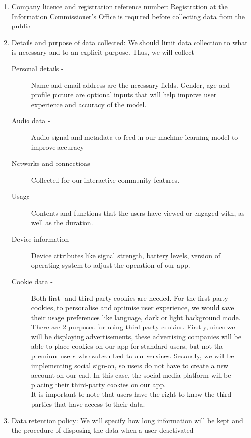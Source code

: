 \begin{enumerate}
    \item Company licence and registration reference number: Registration at the Information Commissioner's Office is required
    before collecting data from the public
    \item Details and purpose of data collected: We should limit data collection to what is necessary and to an explicit purpose.
    Thus, we will collect
    \begin{description}
        \item[Personal details -] Name and email address are the necessary fields. Gender, age and profile picture are optional inputs 
        that will help improve user experience and accuracy of the model. 
        \item[Audio data -] Audio signal and metadata to feed in our machine learning model to improve accuracy.
        \item[Networks and connections -] Collected for our interactive community features.
        \item[Usage -] Contents and functions that the users have viewed or engaged with, as well as the duration.
        \item[Device information -] Device attributes like signal strength, battery levels, version of operating system to adjust the operation of our app.
        \item[Cookie data -] Both first- and third-party cookies are needed. For the first-party cookies, to personalise and optimise user
        experience, we would save their usage preferences like language, dark or light background mode. 
        \\There are 2 purposes for using third-party cookies. Firstly, since we will be displaying advertisements, 
        these advertising companies will be able to place cookies on our app for standard users, but not the premium users who subscribed to our services. 
        Secondly, we will be implementing social sign-on, so users do not have to create a new account on our end. In this case, the social media 
        platform will be placing their third-party cookies on our app.
        \\It is important to note that users have the right to know the third parties that have access to their data.
    \end{description}
    \item Data retention policy: We will specify how long information will be kept and the procedure of disposing the data when a user deactivated

\end{enumerate}
